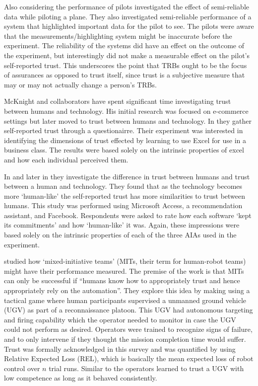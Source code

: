 Also considering the performance of pilots \citet{Wickens1999-la} investigated the effect of semi-reliable data while piloting a plane. They also investigated semi-reliable performance of a system that highlighted important data for the pilot to see. The pilots were aware that the measurements/highlighting system might be inaccurate before the experiment. The reliability of the systems did have an effect on the outcome of the experiment, but interestingly did not make a measurable effect on the pilot's self-reported trust. This underscores the point that TRBs ought to be the focus of assurances as opposed to trust itself, since trust is a subjective measure that may or may not actually change a person's TRBs.

McKnight and collaborators have spent significant time investigating trust between humans and technology. His initial research was focused on e-commerce settings but later moved to trust between humans and technology. In \cite{Mcknight2011-gv} they gather self-reported trust through a questionairre. Their experiment was interested in identifying the dimensions of trust effected by learning to use Excel for use in a business class. The results were based solely on the intrinsic properties of excel and how each individual perceived them.

In \cite{Lankton2008-ct} and later in \cite{Tripp2011-cq} they investigate the difference in trust between humans and trust between a human and technology. They found that as the technology becomes more `human-like' the self-reported trust has more similarities to trust between humans. This study was performed using Microsoft Access, a recommendation assistant, and Facebook. Respondents were asked to rate how each software `kept its commitments' and how `human-like' it was. Again, these impressions were based solely on the intrinsic properties of each of the three AIAs used in the experiment.

\citet{Freedy2007-sg} studied how `mixed-initiative teams' (MITs, their term for human-robot teams) might have their performance measured. The premise of the work is that MITs can only be successful if ``humans know how to appropriately trust and hence appropriately rely on the automation''. They explore this idea by making using a tactical game where human participants supervised a unmanned ground vehicle (UGV) as part of a reconnaissance platoon. This UGV had autonomous targeting and firing capability which the operator needed to monitor in case the UGV could not perform as desired. Operators were trained to recognize signs of failure, and to only intervene if they thought the mission completion time would suffer. Trust was formally acknowledged in this survey and was quantified by using Relative Expected Loss (REL), which is basically the mean expected loss of robot control over $n$ trial runs. Similar to \cite{Muir1996-gt} the operators learned to trust a UGV with low competence as long as it behaved consistently.

